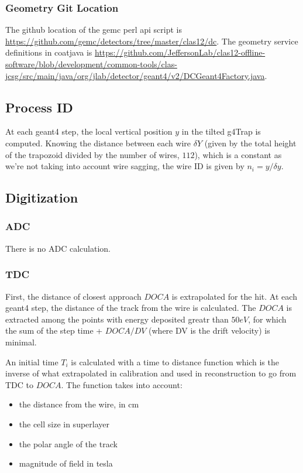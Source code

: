\subsubsection{Geometry Git Location}
The github location of the gemc perl api script is \url{https://github.com/gemc/detectors/tree/master/clas12/dc}.
The geometry service definitions in coatjava is \url{https://github.com/JeffersonLab/clas12-offline-software/blob/development/common-tools/clas-jcsg/src/main/java/org/jlab/detector/geant4/v2/DCGeant4Factory.java}.

\subsection{Process ID}
At each geant4 step, the local vertical position $y$ in the tilted g4Trap is computed. Knowing the distance
between each wire $\delta Y$ (given by the total height of the trapozoid divided by the number of wires, $112$), which is a constant as we're not taking into
account wire sagging, the wire ID is given by $n_i = y / \delta y$.

\subsection{Digitization}

\subsubsection{ADC}
There is no ADC calculation.

\subsubsection{TDC}
First, the distance of closest approach $DOCA$ is extrapolated for the hit. At each geant4 step, the distance of the track from the wire is calculated.
The $DOCA$ is extracted among the points with energy deposited greatr than $50 eV$, for which the sum of the step time + $DOCA / DV$ (where DV is the drift velocity) is minimal.

An initial time $T_i$ is calculated with a time to distance function which is the inverse of what extrapolated in calibration and used in reconstruction to go from TDC to $DOCA$.
The function takes into account:

\begin{itemize}
	\item the distance from the wire, in cm
	\item the cell size in superlayer
	\item the polar angle of the track
	\item magnitude of field in tesla
\end{itemize}

